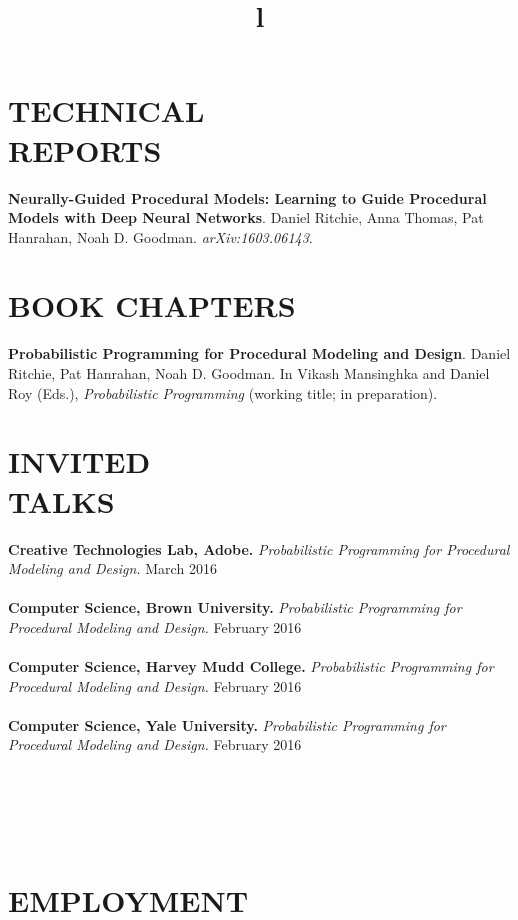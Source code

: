\documentclass[line,margin]{res}
\begin{document}
\begin{resume}
\section {TECHNICAL\\REPORTS}
\textbf{Neurally-Guided Procedural Models: Learning to Guide Procedural Models with Deep Neural Networks}. 
Daniel Ritchie, Anna Thomas, Pat Hanrahan, Noah D. Goodman.
\emph{arXiv:1603.06143}.


\section{BOOK CHAPTERS}
\textbf{Probabilistic Programming for Procedural Modeling and Design}. Daniel Ritchie, Pat Hanrahan, Noah D. Goodman. In Vikash Mansinghka and Daniel Roy (Eds.), \emph{Probabilistic Programming} (working title; in preparation).


\section{INVITED\\TALKS}

\textbf{Creative Technologies Lab, Adobe.} \emph{Probabilistic Programming for Procedural Modeling and Design.} \hfill March 2016
\\ \\
\textbf{Computer Science, Brown University.} \emph{Probabilistic Programming for Procedural Modeling and Design.} \hfill February 2016
\\ \\
\textbf{Computer Science, Harvey Mudd College.} \emph{Probabilistic Programming for Procedural Modeling and Design.} \hfill February 2016
\\ \\
\textbf{Computer Science, Yale University.} \emph{Probabilistic Programming for Procedural Modeling and Design.} \hfill February 2016


\begin{format}
\\
\title{l}\\
\body\\
\end{format}



\section{EMPLOYMENT}


\end{resume}
\end{document}
